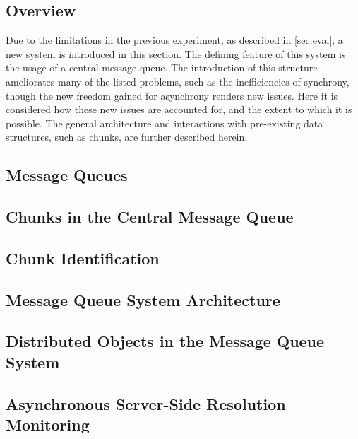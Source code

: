 \subsection{Overview}\label{mqintro}

Due to the limitations in the previous experiment, as described in \cref{sec:eval}, a new system is introduced in this section.
The defining feature of this system is the usage of a central message queue.
The introduction of this structure ameliorates many of the listed problems, such as the inefficiencies of synchrony, though the new freedom gained for asynchrony renders new issues.
Here it is considered how these new issues are accounted for, and the extent to which it is possible.
The general architecture and interactions with pre-existing data structures, such as chunks, are further described herein.

\subsection{Message Queues}\label{central-message-queue}

\subsection{Chunks in the Central Message Queue}

\subsection{Chunk Identification}

\subsection{Message Queue System Architecture}\label{sec:mq-arch}

\subsection{Distributed Objects in the Message Queue System}

\subsection{Asynchronous Server-Side Resolution Monitoring}

